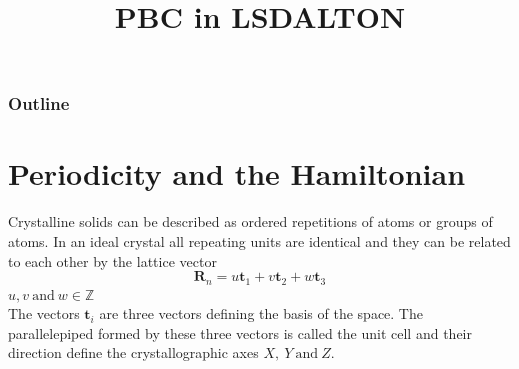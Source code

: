 \documentclass[12pt,a4paper,english]{beamer}
\title{PBC in LSDALTON}
\newcommand{\mbf}{ \mathbf }
\begin{document}
\date{}
\frame{\titlepage}
\begin{frame}
        \frametitle{Outline}
  \tableofcontents
\end{frame}

%

\section{Periodicity and the Hamiltonian}

\begin{frame}
 Crystalline solids can be described as ordered repetitions of atoms or groups
 of atoms. In an ideal crystal all repeating units are 
 identical and they can be related to each other by the lattice vector
 \begin{equation*}
   \mbf R_n= u\mbf t_1 + v\mbf t_2 + w\mbf t_3
 \end{equation*}
 $u,v~\mbox{and}~w\in \mathbb{Z}$
%
\\ The vectors $\mbf t_i$ are three vectors defining the
 basis of the space.
 The parallelepiped formed by these three vectors is called the unit cell and
 their direction define the crystallographic axes $X,~Y~\mbox{and}~Z$.
\end{frame}

\end{document}
